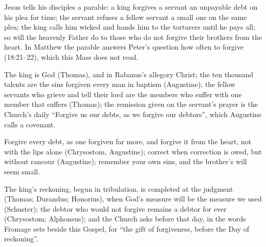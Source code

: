 \begin{fourSenses}
\item[Literal.] Jesus tells his disciples a parable: a king forgives a servant an
unpayable debt on his plea for time; the servant refuses a fellow servant a small
one on the same plea; the king calls him wicked and hands him to the torturers
until he pays all; so will the heavenly Father do to those who do not forgive their
brothers from the heart. In Matthew the parable answers Peter's question how often
to forgive (18:21--22), which this Mass does not read.
\item[Allegorical.] The king is God (Thomas), and in Rabanus's allegory Christ; the
ten thousand talents are the sins forgiven every man in baptism (Augustine); the
fellow servants who grieve and tell their lord are the members who suffer with
one member that suffers (Thomas); the
remission given on the servant's prayer is the Church's daily ``Forgive us our
debts, as we forgive our debtors'', which Augustine calls a covenant.
\item[Moral.] Forgive every debt, as one forgiven far more, and forgive it from the
heart, not with the lips alone (Chrysostom, Augustine); correct when correction is
owed, but without rancour (Augustine); remember your own sins, and the brother's
will seem small.
\item[Anagogical.] The king's reckoning, begun in tribulation, is completed at the
judgment (Thomas; Durandus; Honorius), when God's measure will be the measure we
used (Schuster); the debtor who would not forgive remains a debtor for ever
(Chrysostom; Alphonsus); and the Church asks before that day, in the words Fromage
sets beside this Gospel, for ``the gift of forgiveness, before the Day of
reckoning''.
\end{fourSenses}
